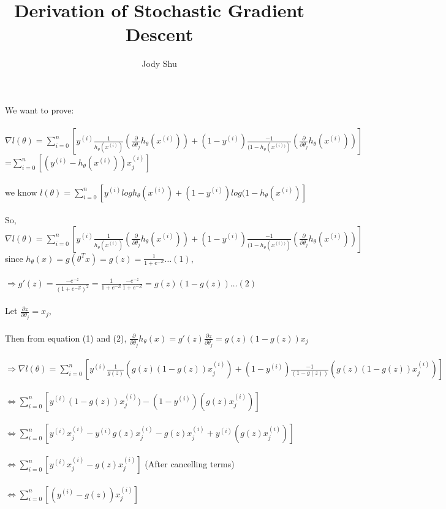 \documentclass[11pt, oneside]{article}   	%
\title{Derivation of Stochastic Gradient Descent}
\author{Jody Shu}
\begin{document}
\begin{Large}
\maketitle

We want to prove:\\
\\$\nabla l (\theta)=\sum_{i=0}^n[y^{(i)}\frac{1}{h_\theta(x^{(i)}) } ( \frac{\partial}{\partial \theta_j}h_\theta(x^{(i)}))+(1-y^{(i)} )\frac{-1}{(1-h_\theta (x^{(i))})}( \frac{\partial}{\partial \theta_j}h_\theta(x^{(i)})) ]$\\
=$\sum_{i=0}^n[(y^{(i)}-h_\theta(x^{(i)}))x^{(i)}_{j} ] $\\
\\
we know $l(\theta)= \sum_{i=0}^n[ y^{(i)}log h_\theta(x^{(i)})+(1-y^{(i)} )log(1-h_\theta (x^{(i)}) ] $\\
\\
So, $\nabla l (\theta)=\sum_{i=0}^n[y^{(i)}\frac{1}{h_\theta(x^{(i)}) } ( \frac{\partial}{\partial \theta_j}h_\theta(x^{(i)}))+(1-y^{(i)} )\frac{-1}{(1-h_\theta (x^{(i))})}( \frac{\partial}{\partial \theta_j}h_\theta(x^{(i)})) ]$\\

since $h_\theta(x)=g(\theta^{T}x)=g(z)=\frac{1}{1+e^{-Z}}\ldots(1)$,\\
\\
$\Longrightarrow g'(z)=\frac{-e^{-z}}{(1+e^{-Z})^2}=\frac{1}{1+e^{-Z}} \frac{-e^{-z}}{1+e^{-Z}}=g(z)(1-g(z))\ldots(2)$
\\
\\
Let $\frac{\partial z}{\partial \theta _{j}}=x_j$, \\
\\
Then from equation (1) and (2), $ \frac{\partial}{\partial \theta_j}h_\theta(x)=g'(z)\frac{\partial z}{\partial \theta_j}=g(z)(1-g(z))x_j$\\
\\
 $\Longrightarrow \nabla l (\theta)=\sum_{i=0}^n[y^{(i)}\frac{1}{g(z)} (g(z)(1-g(z))x^{(i)}_{j})+(1-y^{(i)} )\frac{-1}{(1-g(z))}(g(z)(1-g(z))x^{(i)}_{j}) ]$\\
 \\
 $\Longleftrightarrow \sum_{i=0}^n[y^{(i)}(1-g(z))x^{(i)}_{j})-(1-y^{(i)} )(g(z)x^{(i)}_{j}) ] $\\
 \\
  $\Longleftrightarrow \sum_{i=0}^n[y^{(i)}x^{(i)}_{j}- y^{(i)}g(z)x^{(i)}_{j}-g(z)x^{(i)}_{j}+ y^{(i)}(g(z)x^{(i)}_{j}) ] $\\
  \\
   $\Longleftrightarrow\sum_{i=0}^n[y^{(i)}x^{(i)}_{j}-g(z)x^{(i)}_{j} ] $ (After cancelling terms)\\
   \\
$\Longleftrightarrow\sum_{i=0}^n[(y^{(i)}-g(z))x^{(i)}_{j} ] $\\


\end{Large}
\end{document}
